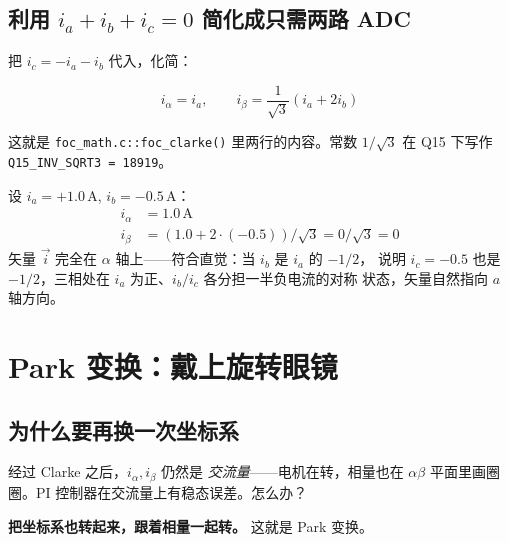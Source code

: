 \documentclass[UTF8,a4paper,11pt]{ctexart}
\newcommand{\code}[1]{\texttt{#1}}
\begin{document}
\subsection{利用 $i_a+i_b+i_c=0$ 简化成只需两路 ADC}

把 $i_c = -i_a - i_b$ 代入，化简：

\[
\boxed{
  \;i_\alpha = i_a,\qquad
  i_\beta  = \frac{1}{\sqrt 3}(i_a + 2 i_b)\;
}
\]

这就是 \code{foc\_math.c::foc\_clarke()} 里两行的内容。常数 $1/\sqrt{3}$ 在 Q15 下写作
\code{Q15\_INV\_SQRT3 = 18919}。

\begin{example}
设 $i_a = +1.0$\,A, $i_b = -0.5$\,A：
\begin{align*}
i_\alpha &= 1.0\,\text{A} \\
i_\beta  &= (1.0 + 2 \cdot (-0.5))/\sqrt 3 = 0/\sqrt 3 = 0
\end{align*}
矢量 $\vec i$ 完全在 $\alpha$ 轴上——符合直觉：当 $i_b$ 是 $i_a$ 的 $-1/2$，
说明 $i_c = -0.5$ 也是 $-1/2$，三相处在 $i_a$ 为正、$i_b/i_c$ 各分担一半负电流的对称
状态，矢量自然指向 $a$ 轴方向。
\end{example}

\section{Park 变换：戴上旋转眼镜}

\subsection{为什么要再换一次坐标系}

经过 Clarke 之后，$i_\alpha, i_\beta$ 仍然是 \emph{交流量}——电机在转，相量也在
$\alpha\beta$ 平面里画圈圈。PI 控制器在交流量上有稳态误差。怎么办？

\textbf{把坐标系也转起来，跟着相量一起转。} 这就是 Park 变换。

\begin{center}
\end{center}
\end{document}
